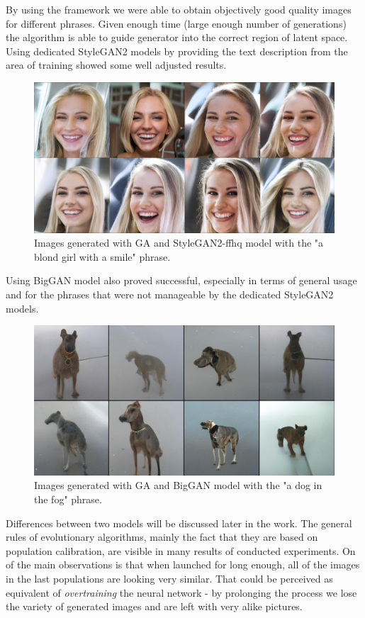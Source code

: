 \documentclass[12pt,a4paper,openany]{book}
\begin{document}
\noindent By using the framework we were able to obtain objectively good quality images for different phrases. Given enough time (large enough number of generations) the algorithm is able to guide generator into the correct region of latent space. Using dedicated StyleGAN2 models by providing the text description from the area of training showed some well adjusted results.

\begin{figure}[H]
    \centering
    \includegraphics[scale=0.6]{figs/blondgirl.png}
    \caption{Images generated with GA and StyleGAN2-ffhq model with the "a blond girl with a smile" phrase.}\label{Fig:blondgirl}
\end{figure}
\newpage
\noindent Using BigGAN model also proved successful, especially in terms of general usage and for the phrases that were not manageable by the dedicated StyleGAN2 models.

\begin{figure}[H]
    \centering
    \includegraphics[scale=0.3]{figs/doginthefog.png}
    \caption{Images generated with GA and BigGAN model with the "a dog in the fog" phrase.}\label{Fig:doginthefog}
\end{figure}
\noindent Differences between two models will be discussed later in the work.\newline
\newline
\noindent The general rules of evolutionary algorithms, mainly the fact that they are based on population calibration, are visible in many results of conducted experiments. On of the main observations is that when launched for long enough, all of the images in the last populations are looking very similar. That could be perceived as equivalent of \textit{overtraining} the neural network - by prolonging the process we lose the variety of generated images and are left with very alike pictures.
\end{document}
